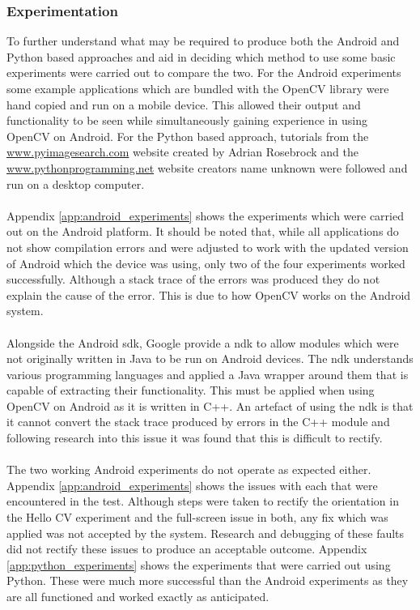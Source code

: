 	\subsubsection{Experimentation}
		To further understand what may be required to produce both the Android and Python based approaches and aid in deciding which method to use some basic experiments were carried out to compare the two. For the Android experiments some example applications which are bundled with the OpenCV library were hand copied and run on a mobile device. This allowed their output and functionality to be seen while simultaneously gaining experience in using OpenCV on Android. For the Python based approach, tutorials from the \url{www.pyimagesearch.com} website created by Adrian Rosebrock  and the \url{www.pythonprogramming.net} website  creators name unknown were followed and run on a desktop computer.
		\\\\
		Appendix \ref{app:android_experiments} shows the experiments which were carried out on the Android platform. It should be noted that, while all applications do not show compilation errors and were adjusted to work with the updated version of Android which the device was using, only two of the four experiments worked successfully. Although a stack trace of the errors was produced they do not explain the cause of the error. This is due to how OpenCV works on the Android system.
		\\\\
		Alongside the Android \gls{sdk}, Google provide a \gls{ndk} to allow modules which were not originally written in Java to be run on Android devices. The \gls{ndk} understands various programming languages and applied a Java wrapper around them that  is capable of extracting their functionality. This must be applied when using OpenCV on Android as it is written in C++. An artefact of using the \gls{ndk} is that it cannot convert the stack trace produced by errors in the C++ module and following  research into this issue it was found that this is difficult to rectify.
		\\\\
		The two working Android experiments do not operate as expected either. Appendix \ref{app:android_experiments} shows the issues with each that were encountered in the test.  Although steps were taken to rectify the orientation in the Hello CV experiment and the full-screen issue in both, any fix which was applied was not accepted by the system. Research and debugging of these faults did not rectify these issues to produce an acceptable outcome.  Appendix \ref{app:python_experiments} shows the experiments that  were carried out using Python. These were much more successful than the Android experiments as they are all functioned and worked exactly as anticipated.
